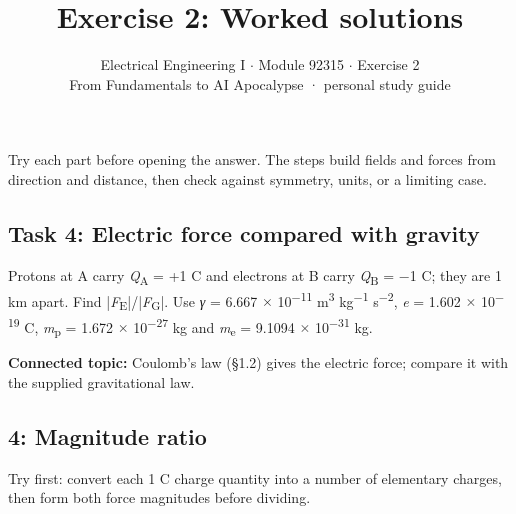\documentclass[11pt]{article}
\title{\sffamily\bfseries\color{FAUblue}Exercise 2: Worked solutions}
\author{Electrical Engineering I \ensuremath{\cdot} Module 92315 \ensuremath{\cdot} Exercise 2\\[2pt]\small From Fundamentals to AI Apocalypse · personal study guide}
\date{}
\begin{document}
\maketitle
\begingroup\footnotesize\setlength{\parskip}{0pt}\tableofcontents\endgroup
\clearpage

{\large Try each part before opening the answer. The steps build fields and forces from direction and distance, then check against symmetry, units, or a limiting case.}


\begin{keepsection}
\section{Task 4: Electric force compared with gravity}

Protons at A carry \textit{Q}\textsubscript{A} = +1 C and electrons at B carry \textit{Q}\textsubscript{B} = \ensuremath{-}1 C; they are 1 km apart. Find |\textit{F}\textsubscript{E}|/|\textit{F}\textsubscript{G}|. Use \textit{γ} = 6.667 \ensuremath{\times} 10\textsuperscript{\ensuremath{-}11} m\textsuperscript{3} kg\textsuperscript{\ensuremath{-}1} s\textsuperscript{\ensuremath{-}2}, \textit{e} = 1.602 \ensuremath{\times} 10\textsuperscript{\ensuremath{-}19} C, \textit{m}\textsubscript{p} = 1.672 \ensuremath{\times} 10\textsuperscript{\ensuremath{-}27} kg and \textit{m}\textsubscript{e} = 9.1094 \ensuremath{\times} 10\textsuperscript{\ensuremath{-}31} kg.

\textbf{Connected topic:} Coulomb’s law (§1.2) gives the electric force; compare it with the supplied gravitational law.

\begin{keepsection}
\subsection{4: Magnitude ratio}

Try first: convert each 1 C charge quantity into a number of elementary charges, then form both force magnitudes before dividing.

\end{keepsection}
\end{keepsection}
\end{document}
